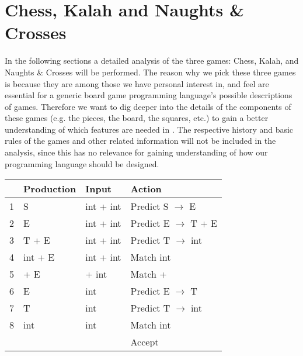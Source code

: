 \section{Chess, Kalah and Naughts \& Crosses}

In the following sections a detailed analysis of the three games: Chess,
Kalah, and Naughts \& Crosses will be performed. The reason why we pick
these three games is because they are among those we have personal
interest in, and feel are essential for a generic board game programming
language's possible descriptions of games. Therefore we want to dig
deeper into the details of the components of these games (e.g. the
pieces, the board, the squares, etc.) to gain a better understanding
of which features are needed in \productname. The respective history
and basic rules of the games and other related information will not
be included in the analysis, since this has no relevance for gaining
understanding of how our programming language should be designed.

\begin{center}
    \begin{tabular}{| l | l | l | l |}                             \hline
      & Production & Input      & Action                        \\ \hline
    1 & S          & int + int  & Predict S $\rightarrow$ E     \\ 
    2 & E          & int + int  & Predict E $\rightarrow$ T + E \\ 
    3 & T + E      & int + int  & Predict T $\rightarrow$ int   \\
    4 & int + E    & int + int  & Match int                     \\ 
    5 & + E        & + int      & Match +                       \\ 
    6 & E          & int        & Predict E $\rightarrow$ T     \\ 
    7 & T          & int        & Predict T $\rightarrow$ int   \\
    8 & int        & int        & Match int                     \\ 
      &            &            & Accept                        \\ \hline
    \end{tabular}
\end{center}

